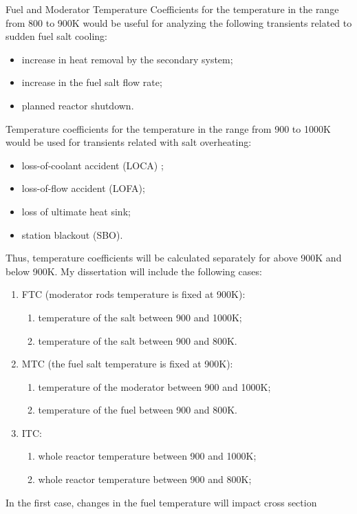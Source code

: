 Fuel and Moderator Temperature Coefficients for the temperature in the range 
from 800 to 900K would be useful for analyzing the following transients 
related to sudden fuel salt cooling: 
\begin{itemize}
	\item increase in heat removal by the secondary system;
	\item increase in the fuel salt flow rate;
	\item planned reactor shutdown.
\end{itemize}
Temperature coefficients for the temperature in the range from 900 to 1000K 
would be used for transients related with salt overheating: 
\begin{itemize}
	\item loss-of-coolant accident (LOCA) ;
	\item loss-of-flow accident (LOFA);
	\item loss of ultimate heat sink;
	\item  station blackout (SBO).
\end{itemize}
Thus, temperature coefficients will be calculated separately for above 900K 
and below 900K. My dissertation will include the following cases: 
\begin{enumerate}
	\item FTC (moderator rods temperature is fixed at 900K):
		\begin{enumerate}[label=(\alph*)]
			\item temperature of the salt between 900 and 1000K;
			\item temperature of the salt between 900 and 800K.
		\end{enumerate}
	\item MTC (the fuel salt temperature is fixed at 900K): 
		\begin{enumerate}[label=(\alph*)]
			\item temperature of the moderator between 900 and 1000K;
			\item temperature of the fuel between 900 and 800K.
		\end{enumerate}
	\item ITC: 
		\begin{enumerate}[label=(\alph*)]
			\item whole reactor temperature between 900 and 1000K;
			\item whole reactor temperature between 900 and 800K;
		\end{enumerate}
\end{enumerate}
In the first case, changes in the fuel temperature will impact cross section 
